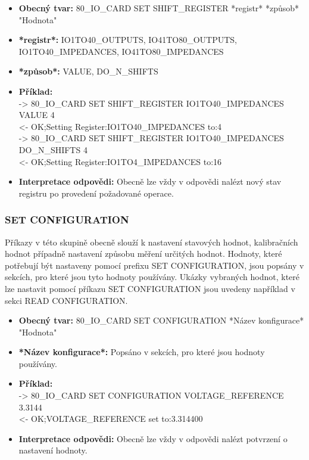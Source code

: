 \begin{itemize}[leftmargin=*]
    \item \textbf{Obecný tvar:} 80\_IO\_CARD SET SHIFT\_REGISTER *registr* *způsob* "Hodnota"
    \item \textbf{*registr*:} IO1TO40\_OUTPUTS, IO41TO80\_OUTPUTS,\\
    IO1TO40\_IMPEDANCES, IO41TO80\_IMPEDANCES
    \item \textbf{*způsob*:} VALUE, DO\_N\_SHIFTS
    \item \textbf{Příklad:}\\
    -> 80\_IO\_CARD SET SHIFT\_REGISTER IO1TO40\_IMPEDANCES VALUE 4\\
    <- OK;Setting Register:IO1TO40\_IMPEDANCES to:4\\
    -> 80\_IO\_CARD SET SHIFT\_REGISTER IO1TO40\_IMPEDANCES DO\_N\_SHIFTS 4\\
    <- OK;Setting Register:IO1TO4\_IMPEDANCES to:16
    \item \textbf{Interpretace odpovědi:} Obecně lze vždy v odpovědi nalézt nový stav registru po provedení požadované operace.
\end{itemize}

\subsubsection{SET CONFIGURATION}
Příkazy v této skupině obecně slouží k nastavení stavových hodnot, kalibračních hodnot případně nastavení způsobu
měření určitých hodnot. Hodnoty, které potřebují být nastaveny pomocí prefixu SET CONFIGURATION, jsou popsány v sekcích,
pro které jsou tyto hodnoty používány.
Ukázky vybraných hodnot, které lze nastavit pomocí příkazu SET CONFIGURATION jsou uvedeny například v sekci READ CONFIGURATION.

\begin{itemize}[leftmargin=*]
    \item \textbf{Obecný tvar:} 80\_IO\_CARD SET CONFIGURATION *Název konfigurace* "Hodnota"
    \item \textbf{*Název konfigurace*:} Popsáno v sekcích, pro které jsou hodnoty používány.
    \item \textbf{Příklad:}\\
    -> 80\_IO\_CARD SET CONFIGURATION VOLTAGE\_REFERENCE 3.3144\\
    <- OK;VOLTAGE\_REFERENCE set to:3.314400
    \item \textbf{Interpretace odpovědi:} Obecně lze vždy v odpovědi nalézt potvrzení o nastavení hodnoty.
\end{itemize}

